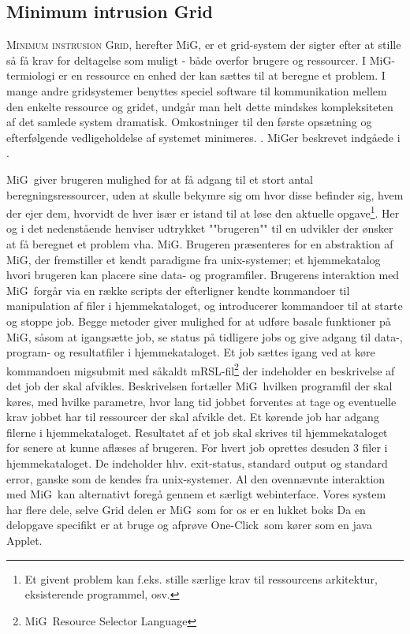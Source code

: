 \documentclass[draft,a4paper,10pt]{article}
\newcommand{\mig}{MiG}
\newcommand{\oc}{One-Click}
\begin{document}
\subsection{Minimum intrusion Grid}\label{mig}

\textsc{Minimum instrusion Grid}, herefter \mig, er et grid-system der sigter efter at stille så få krav for deltagelse som muligt - både overfor brugere og ressourcer. I \mig-termiologi er en ressource en enhed der kan sættes til at beregne et problem. I mange andre gridsystemer benyttes speciel software til kommunikation mellem den enkelte ressource og gridet, undgår man helt dette mindskes kompleksiteten af det samlede system dramatisk. Omkostninger til den første opsætning og efterfølgende vedligeholdelse af systemet minimeres. . \mig er beskrevet indgåede i \cite{simplemig,mig}.

\mig\ giver brugeren mulighed for at få adgang til et stort antal beregningsressourcer, uden at skulle bekymre sig om hvor disse befinder sig, hvem der ejer dem, hvorvidt de hver især er istand til at løse den aktuelle opgave\footnote{Et givent problem kan f.eks. stille særlige krav til ressourcens arkitektur, eksisterende programmel, osv. }. Her og i det nedenstående henviser udtrykket ""brugeren"" til en udvikler der ønsker at få beregnet et problem vha. \mig {}. Brugeren præsenteres for en abstraktion af \mig, der fremstiller et kendt paradigme fra unix-systemer; et hjemmekatalog hvori brugeren kan placere sine data- og programfiler. Brugerens interaktion med \mig\ forgår via en række scripts der efterligner kendte kommandoer til manipulation af filer i hjemmekataloget, og introducerer kommandoer til at starte og stoppe job. Begge metoder giver mulighed for at udføre basale funktioner på \mig, såsom at igangsætte job, se status på tidligere jobs og give adgang til data-, program- og resultatfiler i hjemmekataloget. Et job sættes igang ved at køre kommandoen migsubmit med såkaldt mRSL-fil\footnote{\mig\ Resource Selector Language} der indeholder en beskrivelse af det job der skal afvikles. Beskrivelsen fortæller \mig\ hvilken programfil der skal køres, med hvilke parametre, hvor lang tid jobbet forventes at tage og eventuelle krav jobbet har til ressourcer der skal afvikle det. Et kørende job har adgang filerne i  hjemmekataloget. Resultatet af et job skal skrives til hjemmekataloget for senere at kunne aflæses af brugeren. For hvert job oprettes desuden 3 filer i hjemmekataloget. De indeholder hhv. exit-status, standard output og standard error, ganske som de kendes fra unix-systemer. 
Al den ovennævnte interaktion med \mig\ kan alternativt foregå gennem et særligt webinterface. 
Vores system har flere dele, selve Grid delen er \mig\ som for os er en lukket boks
Da en delopgave specifikt er at bruge og afprøve \oc\ som kører som en java Applet.
\end{document}
